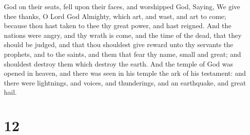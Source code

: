 God on their seats, fell upon their faces, and worshipped God,
 Saying, We give thee thanks, O Lord God Almighty, which
art, and wast, and art to come; because thou hast taken to thee thy
great power, and hast reigned.  And the nations were
angry, and thy wrath is come, and the time of the dead, that they should
be judged, and that thou shouldest give reward unto thy servants the
prophets, and to the saints, and them that fear thy name, small and
great; and shouldest destroy them which destroy the earth.
 And the temple of God was opened in heaven, and there
was seen in his temple the ark of his testament: and there were
lightnings, and voices, and thunderings, and an earthquake, and great
hail.

\hypertarget{section-11}{%
\section{12}\label{section-11}}

